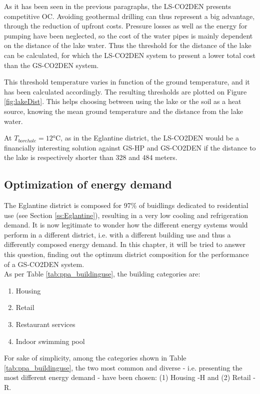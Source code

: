\documentclass{article}
\begin{document}
As it has been seen in the previous paragraphs, the LS-CO2DEN presents competitive OC. Avoiding geothermal drilling can thus represent a big advantage, through the reduction of upfront costs. Pressure losses as well as the energy for pumping have been neglected, so the cost of the water pipes is mainly dependent on the distance of the lake water. Thus the threshold for the distance of the lake can be calculated, for which the LS-CO2DEN system to present a lower total cost than the GS-CO2DEN system. 

This threshold temperature varies in function of the ground temperature, and it has been calculated accordingly. The resulting thresholds are plotted on Figure \ref{fig:lakeDist}. This helps choosing between using the lake or the soil as a heat source, knowing the mean ground temperature and the distance from the lake water.


At $T_{borehole} = 12 \si{\celsius}$, as in the Eglantine district, the LS-CO2DEN would be a financially interesting solution against  GS-HP and GS-CO2DEN if the distance to the lake is respectively shorter than 328 and 484 meters.


\subsection{Optimization of energy demand}
The Eglantine district is composed for 97\% of buidlings dedicated to residential use (see Section \ref{ss:Eglantine}), resulting in a very low cooling and refrigeration demand. It is now legitimate to wonder how the different energy systems would perform in a different district, i.e. with a different building use and thus a differently composed energy demand. In this chapter, it will be tried to answer this question, finding out the optimum district composition for the performance of a GS-CO2DEN system.\\

As per Table \ref{tab:ppa_buildinguse}, the building categories are:
\begin{enumerate}
	\item Housing
	\item Retail
	\item Restaurant services
	\item Indoor swimming pool
\end{enumerate}
For sake of simplicity, among the categories shown in Table \ref{tab:ppa_buildinguse}, the two most common and diverse - i.e. presenting the most different energy demand - have been chosen: (1) Housing -H and (2) Retail - R. 
\end{document}
